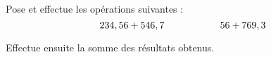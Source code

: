 \begin{myenumerate}
\item Pose et effectue les opérations suivantes :
\[234,56+546,7\kern2cm 56+769,3\]
\item Effectue ensuite la somme des résultats obtenus.
\end{myenumerate}
\begin{multicols}{2}
\begin{myenumerate}
  \item\subitem{}\par{}
\begin{center}
\kern2cm
\end{center}
\columnbreak\par
  \item\subitem{}\par{}
\end{myenumerate}
\end{multicols}
